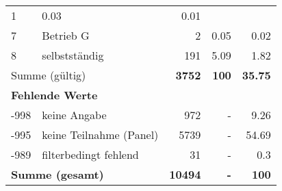 \begin{longtable}{lXrrr}
       \num{1} &
       \num[round-mode=places,round-precision=2]{0.03} &
         \num[round-mode=places,round-precision=2]{0.01} \\

     7 &
     \multicolumn{1}{X}{ Betrieb G   } &


       \num{2} &
       \num[round-mode=places,round-precision=2]{0.05} &
         \num[round-mode=places,round-precision=2]{0.02} \\

     8 &
     \multicolumn{1}{X}{ selbstständig   } &


       \num{191} &
       \num[round-mode=places,round-precision=2]{5.09} &
         \num[round-mode=places,round-precision=2]{1.82} \\
     \midrule
     \multicolumn{2}{l}{Summe (gültig)} &
       \textbf{\num{3752}} &
     \textbf{\num{100}} &
       \textbf{\num[round-mode=places,round-precision=2]{35.75}} \\
     \multicolumn{5}{l}{\textbf{Fehlende Werte}}\\
       -998 &
       keine Angabe &
         \num{972} &
        - &
         \num[round-mode=places,round-precision=2]{9.26} \\
       -995 &
       keine Teilnahme (Panel) &
         \num{5739} &
        - &
         \num[round-mode=places,round-precision=2]{54.69} \\
       -989 &
       filterbedingt fehlend &
         \num{31} &
        - &
         \num[round-mode=places,round-precision=2]{0.3} \\
     \midrule
     \multicolumn{2}{l}{\textbf{Summe (gesamt)}} &
          \textbf{\num{10494}} &
        \textbf{-} &
        \textbf{\num{100}} \\
     \bottomrule
     \end{longtable}
     
